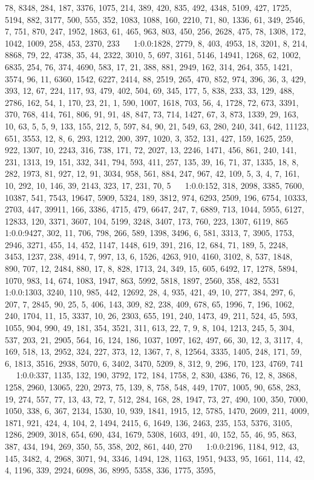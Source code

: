 \documentclass[a4paper,11pt,oneside]{book}
\begin{document}
78, 8348, 284, 187, 3376, 1075, 214, 389, 420, 835, 492, 4348, 5109, 427, 1725, 5194, 882, 3177, 500, 555, 352, 1083, 1088, 160, 2210, 71, 80, 1336, 61, 349, 2546, 7, 751, 870, 247, 1952, 1863, 61, 465, 963, 803, 450, 256, 2628, 475, 78, 1308, 172, 1042, 1009, 258, 453, 2370, 233	$\quad$	1:0.0:1828, 2779, 8, 403, 4953, 18, 3201, 8, 214, 8868, 79, 22, 4738, 35, 44, 2322, 3010, 5, 697, 3161, 5146, 14941, 1268, 62, 1002, 6835, 254, 76, 374, 4690, 583, 17, 21, 388, 881, 2949, 162, 314, 264, 355, 1421, 3574, 96, 11, 6360, 1542, 6227, 2414, 88, 2519, 265, 470, 852, 974, 396, 36, 3, 429, 393, 12, 67, 224, 117, 93, 479, 402, 504, 69, 345, 177, 5, 838, 233, 33, 129, 488, 2786, 162, 54, 1, 170, 23, 21, 1, 590, 1007, 1618, 703, 56, 4, 1728, 72, 673, 3391, 370, 768, 414, 761, 806, 91, 91, 48, 847, 73, 714, 1427, 67, 3, 873, 1339, 29, 163, 10, 63, 5, 5, 9, 133, 155, 212, 5, 597, 84, 90, 21, 549, 63, 280, 240, 341, 642, 11123, 651, 3553, 12, 8, 6, 293, 1212, 200, 397, 1020, 3, 352, 131, 427, 159, 1625, 259, 922, 1307, 10, 2243, 316, 738, 171, 72, 2027, 13, 2246, 1471, 456, 861, 240, 141, 231, 1313, 19, 151, 332, 341, 794, 593, 411, 257, 135, 39, 16, 71, 37, 1335, 18, 8, 282, 1973, 81, 927, 12, 91, 3034, 958, 561, 884, 247, 967, 42, 109, 5, 3, 4, 7, 161, 10, 292, 10, 146, 39, 2143, 323, 17, 231, 70, 5	$\quad$	1:0.0:152, 318, 2098, 3385, 7600, 10387, 541, 7543, 19647, 5909, 5324, 189, 3812, 974, 6293, 2509, 196, 6754, 10333, 2703, 447, 39911, 166, 3386, 4715, 479, 6647, 247, 7, 6889, 713, 1044, 5955, 6127, 12833, 120, 3371, 3607, 104, 5199, 3248, 3407, 173, 760, 223, 1307, 6119, 865	$\quad$	1:0.0:9427, 302, 11, 706, 798, 266, 589, 1398, 3496, 6, 581, 3313, 7, 3905, 1753, 2946, 3271, 455, 14, 452, 1147, 1448, 619, 391, 216, 12, 684, 71, 189, 5, 2248, 3453, 1237, 238, 4914, 7, 997, 13, 6, 1526, 4263, 910, 4160, 3102, 8, 537, 1848, 890, 707, 12, 2484, 880, 17, 8, 828, 1713, 24, 349, 15, 605, 6492, 17, 1278, 5894, 1070, 983, 14, 674, 1083, 1947, 863, 5992, 5818, 1897, 2560, 358, 482, 5531	$\quad$	1:0.0:1303, 3240, 110, 985, 442, 12692, 28, 4, 935, 421, 49, 10, 277, 384, 297, 6, 207, 7, 2845, 90, 25, 5, 406, 143, 309, 82, 238, 409, 678, 65, 1996, 7, 196, 1062, 240, 1704, 11, 15, 3337, 10, 26, 2303, 655, 191, 240, 1473, 49, 211, 524, 45, 593, 1055, 904, 990, 49, 181, 354, 3521, 311, 613, 22, 7, 9, 8, 104, 1213, 245, 5, 304, 537, 203, 21, 2905, 564, 16, 124, 186, 1037, 1097, 162, 497, 66, 30, 12, 3, 3117, 4, 169, 518, 13, 2952, 324, 227, 373, 12, 1367, 7, 8, 12564, 3335, 1405, 248, 171, 59, 6, 1813, 3516, 2938, 5070, 6, 3402, 3470, 5209, 8, 312, 9, 296, 170, 123, 4769, 741	$\quad$	1:0.0:337, 1135, 132, 190, 3792, 172, 184, 1758, 2, 830, 4386, 76, 12, 8, 3868, 1258, 2960, 13065, 220, 2973, 75, 139, 8, 758, 548, 449, 1707, 1005, 90, 658, 283, 19, 274, 557, 77, 13, 43, 72, 7, 512, 284, 168, 28, 1947, 73, 27, 490, 100, 350, 7000, 1050, 338, 6, 367, 2134, 1530, 10, 939, 1841, 1915, 12, 5785, 1470, 2609, 211, 4009, 1871, 921, 424, 4, 104, 2, 1494, 2415, 6, 1649, 136, 2463, 235, 153, 5376, 3105, 1286, 2909, 3018, 654, 690, 434, 1679, 5308, 1603, 491, 40, 152, 55, 46, 95, 863, 387, 434, 194, 269, 350, 55, 358, 202, 861, 440, 270	$\quad$	1:0.0:2196, 1184, 912, 43, 145, 3482, 4, 2968, 3071, 94, 3346, 1494, 128, 1163, 1951, 9433, 95, 1661, 114, 42, 4, 1196, 339, 2924, 6098, 36, 8995, 5358, 336, 1775, 3595, 
\end{document}
